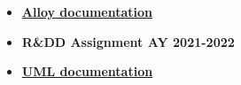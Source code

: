\documentclass[../../main.tex]{subfiles}
\begin{document}
\begin{itemize}
    \item \textbf{\href{https://alloytools.org/documentation.html}{Alloy documentation}}
    \item \textbf{R\&DD Assignment AY 2021-2022}
    \item \textbf{\href{https://www.uml-diagrams.org/}{UML documentation}}
\end{itemize}
\end{document}
